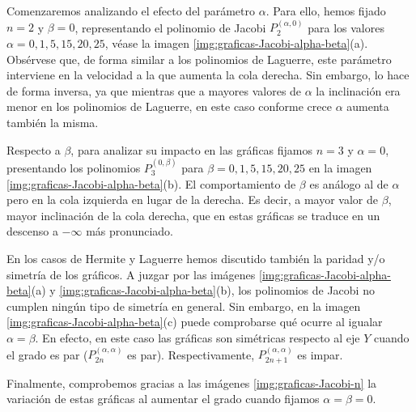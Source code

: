 Comenzaremos analizando el efecto del parámetro $\alpha$. Para ello, hemos fijado $n=2$ y $\beta=0$, representando el polinomio de Jacobi $P_2^{(\alpha,0)}$ para los valores $\alpha=0,1,5,15,20,25$, véase la imagen \ref{img:graficas-Jacobi-alpha-beta}(a). Obsérvese que, de forma similar a los polinomios de Laguerre, este parámetro interviene en la velocidad a la que aumenta la cola derecha. Sin embargo, lo hace de forma inversa, ya que mientras que a mayores valores de $\alpha$ la inclinación era menor en los polinomios de Laguerre, en este caso conforme crece $\alpha$ aumenta también la misma.

Respecto a $\beta$, para analizar su impacto en las gráficas fijamos $n=3$ y $\alpha=0$, presentando los polinomios $P_3^{(0,\beta)}$ para $\beta=0,1,5,15,20,25$ en la imagen \ref{img:graficas-Jacobi-alpha-beta}(b). El comportamiento de $\beta$ es análogo al de $\alpha$ pero en la cola izquierda en lugar de la derecha. Es decir, a mayor valor de $\beta$, mayor inclinación de la cola derecha, que en estas gráficas se traduce en un descenso a $-\infty$ más pronunciado.

En los casos de Hermite y Laguerre hemos discutido también la paridad y/o simetría de los gráficos. A juzgar por las imágenes \ref{img:graficas-Jacobi-alpha-beta}(a) y \ref{img:graficas-Jacobi-alpha-beta}(b), los polinomios de Jacobi no cumplen ningún tipo de simetría en general. Sin embargo, en la imagen \ref{img:graficas-Jacobi-alpha-beta}(c) puede comprobarse qué ocurre al igualar $\alpha=\beta$. En efecto, en este caso las gráficas son simétricas respecto al eje $Y$ cuando el grado es par ($P_{2n}^{(\alpha,\alpha)}$ es par). Respectivamente, $P_{2n+1}^{(\alpha,\alpha)}$ es impar. 

Finalmente, comprobemos gracias a las imágenes \ref{img:graficas-Jacobi-n} la variación de estas gráficas al aumentar el grado cuando fijamos $\alpha = \beta = 0$.

